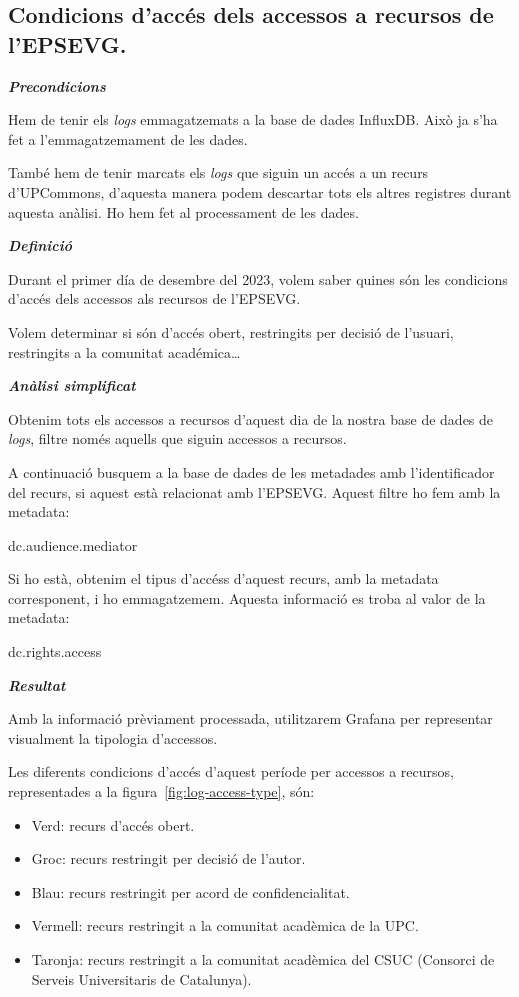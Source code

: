 \documentclass[lettersize,journal]{IEEEtran}
\begin{document}
\subsection{Condicions d'accés dels accessos a recursos de l'EPSEVG.}\label{subsec:use-case-3}

\textit{\textbf{Precondicions}}

Hem de tenir els \textit{logs} emmagatzemats a la base de dades InfluxDB.
Això ja s'ha fet a l'emmagatzemament de les dades.

També hem de tenir marcats els \textit{logs} que siguin un accés a un recurs d'UPCommons, d'aquesta manera podem descartar tots els altres registres durant aquesta anàlisi.
Ho hem fet al processament de les dades.

\textit{\textbf{Definició}}

Durant el primer día de desembre del 2023, volem saber quines són les condicions d'accés dels accessos als recursos de l'EPSEVG.

Volem determinar si són d'accés obert, restringits per decisió de l'usuari, restringits a la comunitat académica\dots

\textit{\textbf{Anàlisi simplificat}}

Obtenim tots els accessos a recursos d'aquest dia de la nostra base de dades de \textit{logs}, filtre només aquells que siguin accessos a recursos.

A continuació busquem a la base de dades de les metadades amb l'identificador del recurs, si aquest està relacionat amb l'EPSEVG.
Aquest filtre ho fem amb la metadata:
\begin{center}
    {dc.audience.mediator}
\end{center}

Si ho està, obtenim el tipus d'accéss d'aquest recurs, amb la metadata corresponent, i ho emmagatzemem.
Aquesta informació es troba al valor de la metadata:
\begin{center}
    {dc.rights.access}
\end{center}

\textit{\textbf{Resultat}}

Amb la informació prèviament processada, utilitzarem Grafana per representar visualment la tipologia d'accessos.

Les diferents condicions d'accés d'aquest període per accessos a recursos, representades a la figura~\ref{fig:log-access-type}, són:
\begin{itemize}
    \item Verd: recurs d'accés obert.
    \item Groc: recurs restringit per decisió de l'autor.
    \item Blau: recurs restringit per acord de confidencialitat.
    \item Vermell: recurs restringit a la comunitat acadèmica de la UPC.
    \item Taronja: recurs restringit a la comunitat acadèmica del CSUC (Consorci de Serveis Universitaris de Catalunya).
\end{itemize}
\end{document}
